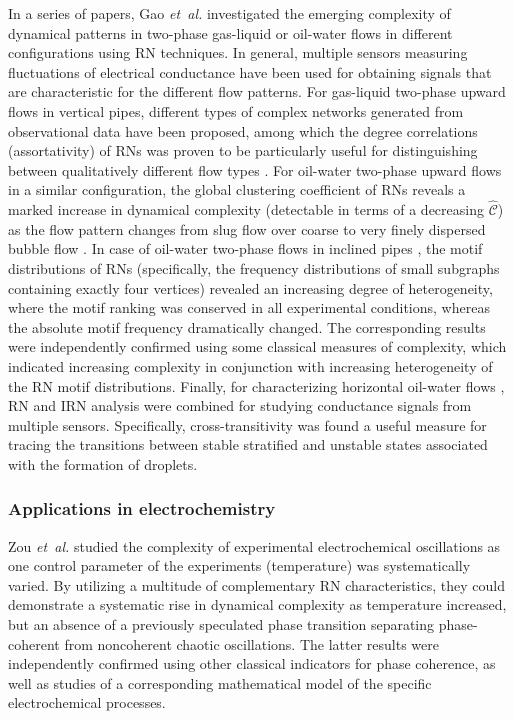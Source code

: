 \documentclass[graybox]{svmult}
\begin{document}
In a series of papers, Gao \textit{et~al.} investigated the emerging complexity of dynamical patterns in two-phase gas-liquid or oil-water flows in different configurations using RN techniques. In general, multiple sensors measuring fluctuations of electrical conductance have been used for obtaining signals that are characteristic for the different flow patterns. For gas-liquid two-phase upward flows in vertical pipes, different types of complex networks generated from observational data have been proposed, among which the degree correlations (assortativity) of RNs was proven to be particularly useful for distinguishing between qualitatively different flow types \cite{Gao2009}. For oil-water two-phase upward flows in a similar configuration, the global clustering coefficient of RNs reveals a marked increase in dynamical complexity (detectable in terms of a decreasing $\hat{\mathcal{C}}$) as the flow pattern changes from slug flow over coarse to very finely dispersed bubble flow \cite{Gao2013PLA}. In case of oil-water two-phase flows in inclined pipes \cite{Gao2010PRE}, the motif distributions of RNs (specifically, the frequency distributions of small subgraphs containing exactly four vertices) revealed an increasing degree of heterogeneity, where the motif ranking was conserved in all experimental conditions, whereas the absolute motif frequency dramatically changed. The corresponding results were independently confirmed using some classical measures of complexity, which indicated increasing complexity in conjunction with increasing heterogeneity of the RN motif distributions. Finally, for characterizing horizontal oil-water flows \cite{Gao2013EPL}, RN and IRN analysis were combined for studying conductance signals from multiple sensors. Specifically, cross-transitivity was found a useful measure for tracing the transitions between stable stratified and unstable states associated with the formation of droplets.


\subsubsection{Applications in electrochemistry}

Zou \textit{et~al.} \cite{Zou2012bChaos} studied the complexity of experimental electrochemical oscillations as one control parameter of the experiments (temperature) was systematically varied. By utilizing a multitude of complementary RN characteristics, they could demonstrate a systematic rise in dynamical complexity as temperature increased, but an absence of a previously speculated phase transition \cite{wickramasinghe_chaos_2010} separating phase-coherent from noncoherent chaotic oscillations. The latter results were independently confirmed using other classical indicators for phase coherence, as well as studies of a corresponding mathematical model of the specific electrochemical processes.
\end{document}

